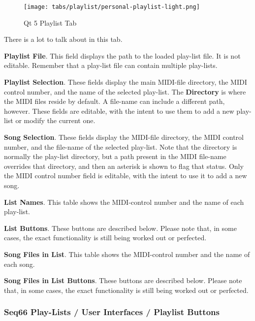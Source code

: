 \begin{figure}[H]
   \centering 
   \texttt{[image: tabs/playlist/personal-playlist-light.png]}
   \caption*{Qt 5 Playlist Tab}
\end{figure}

   There is a lot to talk about in this tab.

   \begin{enumber}
      \item \textbf{Playlist File}.
         This field displays the path to the loaded
         play-list file.  It is not editable.  Remember that
         a play-list file can contain multiple play-lists.
      \item \textbf{Playlist Selection}.
         These fields display the main MIDI-file directory,
         the MIDI control number, and the name of the selected play-list.
         The \textbf{Directory} is where the MIDI files reside by default.
         A file-name can include a different path, however.
         These fields are editable, with the intent to use them to add a new
         play-list or modify the current one.
      \item \textbf{Song Selection}.
         These fields display the MIDI-file directory,
         the MIDI control number, and the file-name of the selected play-list.
         Note that the directory is normally the play-list directory, but a
         path present in the MIDI file-name overrides that directory, and then
         an asterisk is shown to flag that status.
         Only the MIDI control number field is editable,
         with the intent to use it to add a new
         song.
      \item \textbf{List Names}.
         This table shows the MIDI-control number and
         the name of each play-list.
      \item \textbf{List Buttons}.
         These buttons are described below.
         Please note that, in some cases, the exact functionality is still
         being worked out or perfected.
      \item \textbf{Song Files in List}.
         This table shows the MIDI-control number and
         the name of each song.
      \item \textbf{Song Files in List Buttons}.
         These buttons are described below.
         Please note that, in some cases, the exact functionality is still
         being worked out or perfected.
   \end{enumber}

\subsubsection{Seq66 Play-Lists / User Interfaces / Playlist Buttons}
\label{subsubsec:playlist_ui_playlist_buttons}


